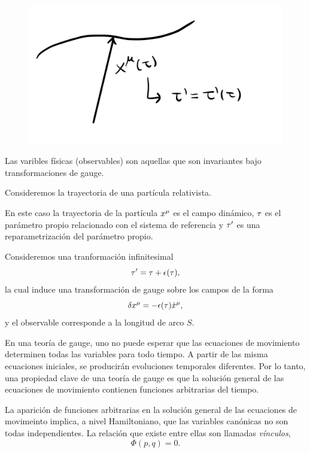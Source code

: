 \begin{figure}
\includegraphics[width=1.0\linewidth]{1-particula} 
\end{figure}
Las varibles físicas (observables) son aquellas que son invariantes bajo transformaciones de gauge.



\begin{ej}


	Consideremos la trayectoria de una partícula relativista.
	
	En este caso la trayectoria de la partícula $x^\mu$ es el campo dinámico, $\tau $ es el parámetro propio relacionado con el sistema de referencia y $\tau' $ es una reparametrización del parámetro propio.
	
	Consideremos una tranformación infinitesimal
	\begin{equation}
  \tau'=\tau +\epsilon(\tau ),
\end{equation}
la cual induce una transformación de gauge sobre los campos  de la forma
\begin{equation}
  \delta x^\mu =-\epsilon (\tau )\dot{x}^\mu,
\end{equation}
y el observable corresponde a la longitud de arco $S$.
\end{ej}


En una teoría de gauge, uno no puede esperar que las ecuaciones de movimiento determinen todas las variables para todo tiempo. A partir de las misma ecuaciones iniciales, se producirán evoluciones temporales diferentes. Por lo tanto, una propiedad clave de una teoría de gauge es que la solución general de las ecuaciones de movimiento contienen funciones arbitrarias del tiempo.

La aparición de funciones arbitrarias en la solución general de las ecuaciones de movimeinto implica, a nivel Hamiltoniano, que las variables canónicas no son todas independientes. La relación que existe entre ellas son llamadas \textit{vínculos},
\begin{equation}
  \Phi(p,q)=0.
\end{equation}

